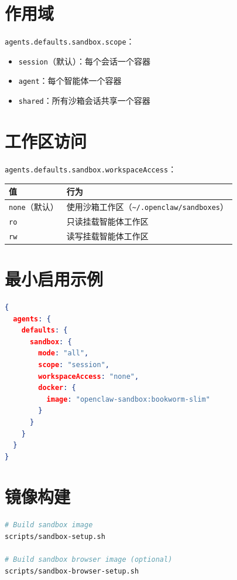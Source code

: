 \section{作用域}

\texttt{agents.defaults.sandbox.scope}：

\begin{itemize}
  \item \texttt{session}（默认）：每个会话一个容器
  \item \texttt{agent}：每个智能体一个容器
  \item \texttt{shared}：所有沙箱会话共享一个容器
\end{itemize}

\section{工作区访问}

\texttt{agents.defaults.sandbox.workspaceAccess}：

\begin{center}
\begin{tabular}{ll}
\toprule
\textbf{值} & \textbf{行为} \\
\midrule
\texttt{none}（默认） & 使用沙箱工作区（\texttt{\textasciitilde{}/.openclaw/sandboxes}） \\
\texttt{ro} & 只读挂载智能体工作区 \\
\texttt{rw} & 读写挂载智能体工作区 \\
\bottomrule
\end{tabular}
\end{center}

\section{最小启用示例}

\begin{lstlisting}[language=json]
{
  agents: {
    defaults: {
      sandbox: {
        mode: "all",
        scope: "session",
        workspaceAccess: "none",
        docker: {
          image: "openclaw-sandbox:bookworm-slim"
        }
      }
    }
  }
}
\end{lstlisting}

\section{镜像构建}

\begin{lstlisting}[language=bash]
# Build sandbox image
scripts/sandbox-setup.sh

# Build sandbox browser image (optional)
scripts/sandbox-browser-setup.sh
\end{lstlisting}

